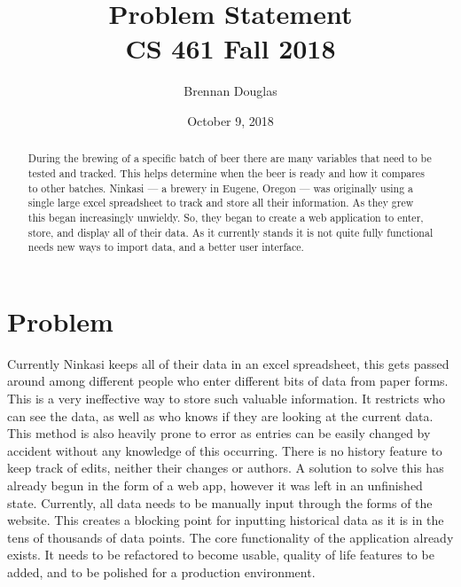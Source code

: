 \documentclass[draftclsnofoot,onecolumn,letterpaper,compsoc,10pt]{IEEEtran}
\title{Problem Statement\\\large CS 461 Fall 2018}
\author{Brennan Douglas}
\date{October 9, 2018}
\begin{document}
\begin{titlingpage}
	\maketitle
    \begin{abstract}
        \noindent
        During the brewing of a specific batch of beer there are many variables that need to be tested and tracked.  This helps determine when the beer is ready and how it compares to other batches.  Ninkasi --- a brewery in Eugene, Oregon --- was originally using a single large excel spreadsheet to track and store all their information.  As they grew this began increasingly unwieldy.  So, they began to create a web application to enter, store, and display all of their data.  As it currently stands it is not quite fully functional needs new ways to import data, and a better user interface.
    \end{abstract}
\end{titlingpage}
\newpage %

\clearpage



\section{Problem}
Currently Ninkasi keeps all of their data in an excel spreadsheet, this gets passed around among different people who enter different bits of data from paper forms.  This is a very ineffective way to store such valuable information.  It restricts who can see the data, as well as who knows if they are looking at the current data.  This method is also heavily prone to error as entries can be easily changed by accident without any knowledge of this occurring.  There is no history feature to keep track of edits, neither their changes or authors.  A solution to solve this has already begun in the form of a web app, however it was left in an unfinished state.  Currently, all data needs to be manually input through the forms of the website.  This creates a blocking point for inputting historical data as it is in the tens of thousands of data points.  The core functionality of the application already exists.  It needs to be refactored to become usable, quality of life features to be added, and to be polished for a production environment.
\end{document}
